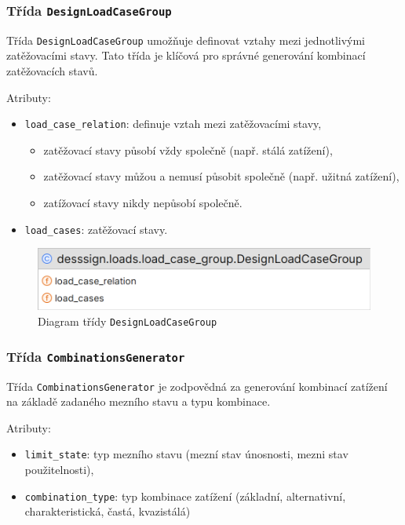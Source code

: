 \subsubsection*{Třída \texttt{DesignLoadCaseGroup}}
Třída \texttt{DesignLoadCaseGroup} umožňuje definovat vztahy mezi jednotlivými zatěžovacími stavy. Tato třída je klíčová pro správné generování kombinací zatěžovacích stavů.

Atributy:
\begin{itemize}
    \item \texttt{load\_case\_relation}: definuje vztah mezi zatěžovacími stavy,
    \begin{itemize}
        \item zatěžovací stavy působí vždy společně (např. stálá zatížení),
        \item zatěžovací stavy můžou a nemusí působit společně (např. užitná zatížení),
        \item zatížovací stavy nikdy nepůsobí společně.
    \end{itemize}
    \item \texttt{load\_cases}: zatěžovací stavy.
\end{itemize}

\begin{figure}[H]
    \includegraphics{assets/figures/desssign/design_load_case_group.png}
    \caption{Diagram třídy \texttt{DesignLoadCaseGroup}}
    \label{fig:class_design_load_case_group}
\end{figure}

\subsubsection*{Třída \texttt{CombinationsGenerator}}
Třída \texttt{CombinationsGenerator} je zodpovědná za generování kombinací zatížení na základě zadaného mezního stavu a typu kombinace.

Atributy:
\begin{itemize}
    \item \texttt{limit\_state}: typ mezního stavu (mezní stav únosnosti, mezni stav použitelnosti),
    \item \texttt{combination\_type}: typ kombinace zatížení (základní, alternativní, charakteristická, častá, kvazistálá)
\end{itemize}

